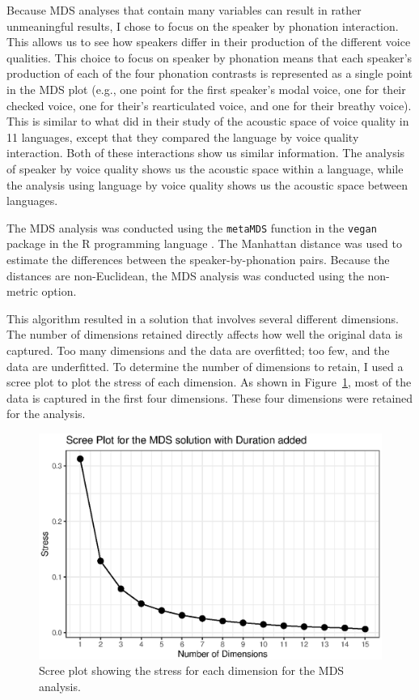 Because MDS analyses that contain many variables can result in rather unmeaningful results, I chose to focus on the speaker by phonation interaction. This allows us to see how speakers differ in their production of the different voice qualities. This choice to focus on speaker by phonation means that each speaker's production of each of the four phonation contrasts is represented as a single point in the MDS plot (e.g., one point for the first speaker's modal voice, one for their checked voice, one for their's rearticulated voice, and one for their breathy voice). This is similar to what \citet{keatingCrosslanguageAcousticSpace2023} did in their study of the acoustic space of voice quality in 11 languages, except that they compared the language by voice quality interaction. Both of these interactions show us similar information. The analysis of speaker by voice quality shows us the acoustic space within a language, while the analysis using language by voice quality shows us the acoustic space between languages.

The MDS analysis was conducted using the \texttt{metaMDS} function in the \texttt{vegan} package \citep{oksanenVeganCommunityEcology2025} in the R programming language \citep{rcoreteamLanguageEnvironmentStatistical2024}. The Manhattan distance was used to estimate the differences between the speaker-by-phonation pairs. Because the distances are non-Euclidean, the MDS analysis was conducted using the non-metric option.

This algorithm resulted in a solution that involves several different dimensions. The number of dimensions retained directly affects how well the original data is captured. Too many dimensions and the data are overfitted; too few, and the data are underfitted. To determine the number of dimensions to retain, I used a scree plot to plot the stress of each dimension. As shown in Figure~\ref{fig:stress_plot}, most of the data is captured in the first four dimensions. These four dimensions were retained for the analysis.

\begin{figure}[!h]
    \centering
    \includegraphics[width = 0.9\linewidth]{images/MDS/stress_plot_dur.eps}
    \caption{Scree plot showing the stress for each dimension for the MDS analysis.}
    \label{fig:stress_plot}
\end{figure}

